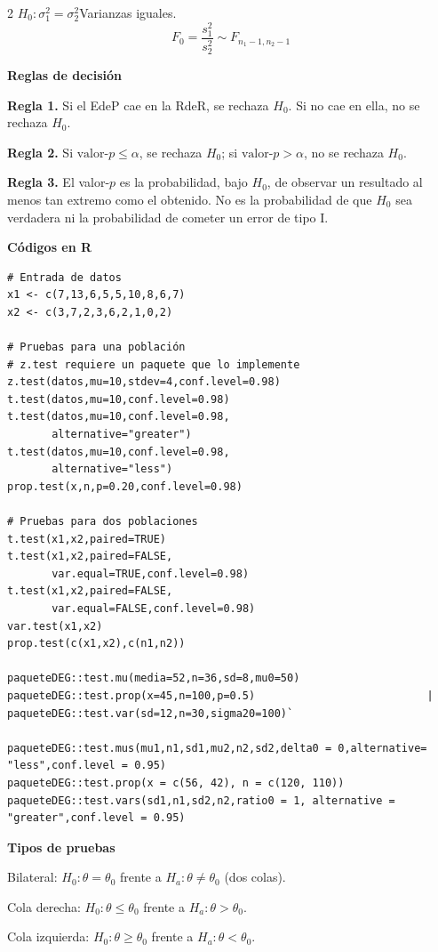 \documentclass[letterpaper,9pt]{extarticle}
\begin{document}
\begin{multicols}{2}
\textbf{$H_0:\sigma_1^2=\sigma_2^2$}\quad Varianzas iguales.
\begin{equation}
F_0=\frac{s_1^2}{s_2^2}\sim F_{n_1-1,n_2-1}
\end{equation}

\textbf{Reglas de decisión}

\textbf{Regla 1.} Si el EdeP cae en la RdeR, se rechaza $H_0$. Si no cae en ella, no se rechaza $H_0$.

\textbf{Regla 2.} Si $\text{valor-}p\leq\alpha$, se rechaza $H_0$; si $\text{valor-}p>\alpha$, no se rechaza $H_0$.

\textbf{Regla 3.} El valor-$p$ es la probabilidad, bajo $H_0$, de observar un resultado al menos tan extremo como el obtenido. No es la probabilidad de que $H_0$ sea verdadera ni la probabilidad de cometer un error de tipo I.

\textbf{Códigos en R}

\scriptsize
\begin{verbatim}
# Entrada de datos
x1 <- c(7,13,6,5,5,10,8,6,7)
x2 <- c(3,7,2,3,6,2,1,0,2)

# Pruebas para una población
# z.test requiere un paquete que lo implemente
z.test(datos,mu=10,stdev=4,conf.level=0.98)
t.test(datos,mu=10,conf.level=0.98)
t.test(datos,mu=10,conf.level=0.98,
       alternative="greater")
t.test(datos,mu=10,conf.level=0.98,
       alternative="less")
prop.test(x,n,p=0.20,conf.level=0.98)

# Pruebas para dos poblaciones
t.test(x1,x2,paired=TRUE)
t.test(x1,x2,paired=FALSE,
       var.equal=TRUE,conf.level=0.98)
t.test(x1,x2,paired=FALSE,
       var.equal=FALSE,conf.level=0.98)
var.test(x1,x2)
prop.test(c(x1,x2),c(n1,n2))

paqueteDEG::test.mu(media=52,n=36,sd=8,mu0=50)
paqueteDEG::test.prop(x=45,n=100,p=0.5)                           |
paqueteDEG::test.var(sd=12,n=30,sigma20=100)`  

paqueteDEG::test.mus(mu1,n1,sd1,mu2,n2,sd2,delta0 = 0,alternative= "less",conf.level = 0.95)
paqueteDEG::test.prop(x = c(56, 42), n = c(120, 110))                                        
paqueteDEG::test.vars(sd1,n1,sd2,n2,ratio0 = 1, alternative = "greater",conf.level = 0.95) 

\end{verbatim}
\normalsize
\textbf{Tipos de pruebas}

Bilateral: $H_0:\theta=\theta_0$ frente a $H_a:\theta\ne\theta_0$ (dos colas).

Cola derecha: $H_0:\theta\leq\theta_0$ frente a $H_a:\theta>\theta_0$.

Cola izquierda: $H_0:\theta\geq\theta_0$ frente a $H_a:\theta<\theta_0$.
\end{multicols}
\end{document}
